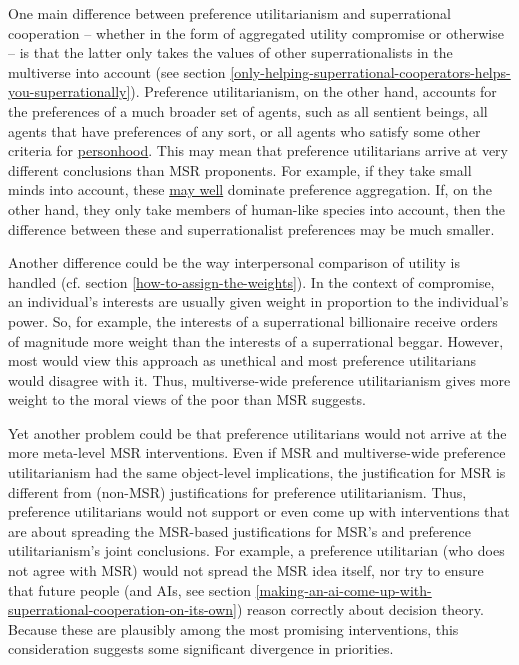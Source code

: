 One main difference between preference utilitarianism and superrational
cooperation -- whether in the form of aggregated utility compromise or
otherwise -- is that the latter only takes the values of other
superrationalists in the multiverse into account (see section
\ref{only-helping-superrational-cooperators-helps-you-superrationally}).
Preference utilitarianism, on the other hand, accounts for the
preferences of a much broader set of agents, such as all sentient
beings, all agents that have preferences of any sort, or all agents who
satisfy some other criteria for
\href{https://en.wikipedia.org/wiki/Personhood}{personhood}. This
may mean that preference utilitarians arrive at very different
conclusions than MSR proponents. For example, if they take small minds
into account, these
\href{https://en.wikipedia.org/wiki/Biomass_(ecology)\#Global_biomass}{may
well} dominate preference aggregation. If, on the other hand, they only
take members of human-like species into account, then the difference
between these and superrationalist preferences may be much smaller.

Another difference could be the way interpersonal comparison of utility
is handled (cf. section
\ref{how-to-assign-the-weights}). In the context of compromise, an individual's interests
are usually given weight in proportion to the individual's power. So,
for example, the interests of a superrational billionaire receive orders
of magnitude more weight than the interests of a superrational beggar.
However, most would view this approach as unethical and most preference
utilitarians would disagree with it. Thus, multiverse-wide preference
utilitarianism gives more weight to the moral views of the poor than MSR
suggests.

Yet another problem could be that preference utilitarians would not
arrive at the more meta-level MSR interventions. Even if MSR and
multiverse-wide preference utilitarianism had the same object-level
implications, the justification for MSR is different from (non-MSR)
justifications for preference utilitarianism. Thus, preference
utilitarians would not support or even come up with interventions that
are about spreading the MSR-based justifications for MSR's and
preference utilitarianism's joint conclusions. For example, a preference
utilitarian (who does not agree with MSR) would not spread the MSR idea
itself, nor try to ensure that future people (and AIs, see section
\ref{making-an-ai-come-up-with-superrational-cooperation-on-its-own}) reason
correctly about decision theory. Because these are plausibly among the
most promising interventions, this consideration suggests some
significant divergence in priorities.

